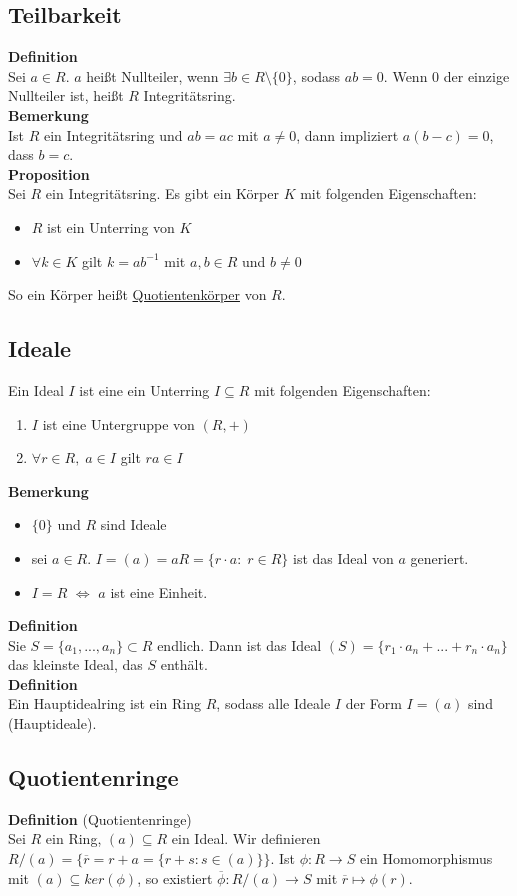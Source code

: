\documentclass[a4paper, 12pt]{article}
\begin{document}
\subsection{Teilbarkeit}
\textbf{Definition}\\
Sei $a \in R$. $a$ heißt Nullteiler, wenn $\exists b \in R\setminus\{0\}$, sodass $ab = 0$. Wenn $0$ der einzige Nullteiler ist, heißt $R$ Integritätsring.\\
\textbf{Bemerkung}\\
Ist $R$ ein Integritätsring und $ab = ac$ mit $a\neq 0$, dann impliziert $a(b-c) = 0$, dass $b=c$.\\
\textbf{Proposition}\\
Sei $R$ ein Integritätsring. Es gibt ein Körper $K$ mit folgenden Eigenschaften: \begin{itemize}
	\item $R$ ist ein Unterring von $K$
	\item $\forall k \in K$ gilt $k = ab^{-1}$ mit $a,b \in R$ und $b\neq 0$
\end{itemize}
So ein Körper heißt \underline{Quotientenkörper} von $R$.
\subsection{Ideale}
Ein Ideal $I$ ist eine ein Unterring $I\subseteq R$ mit folgenden Eigenschaften: \begin{enumerate}
	\item $I$ ist eine Untergruppe von $(R,+)$
	\item $\forall r \in R, \; a \in I$ gilt $ra \in I$
\end{enumerate}
\textbf{Bemerkung}
\begin{itemize}
	\item $\{0\}$ und $R$ sind Ideale
	\item sei $a \in R$. $I = (a) = aR = \{r\cdot a: \; r \in R\}$ ist das Ideal von $a$ generiert.
	\item $I=R$ $\Leftrightarrow$ $a$ ist eine Einheit.
\end{itemize}
\textbf{Definition}\\
Sie $S = \{a_1,...,a_n\} \subset R$ endlich. Dann ist das Ideal $(S) = \{r_1\cdot a_n+...+r_n\cdot a_n\}$ das kleinste Ideal, das $S$ enthält.\\
\textbf{Definition}\\
Ein Hauptidealring ist ein Ring $R$, sodass alle Ideale $I$ der Form $I = (a)$ sind (Hauptideale).
\subsection{Quotientenringe}
\textbf{Definition} (Quotientenringe)\\
Sei $R$ ein Ring, $(a) \subseteq R$ ein Ideal. Wir definieren $R/(a) = \{\overline{r} = r+a = \{r+s : s \in (a)\}\}$. Ist $\phi: R \to S$ ein Homomorphismus mit $(a) \subseteq ker(\phi)$, so existiert $\overline{\phi}: R/(a) \to S$ mit $\overline{r} \mapsto \phi(r)$.\\
\end{document}
